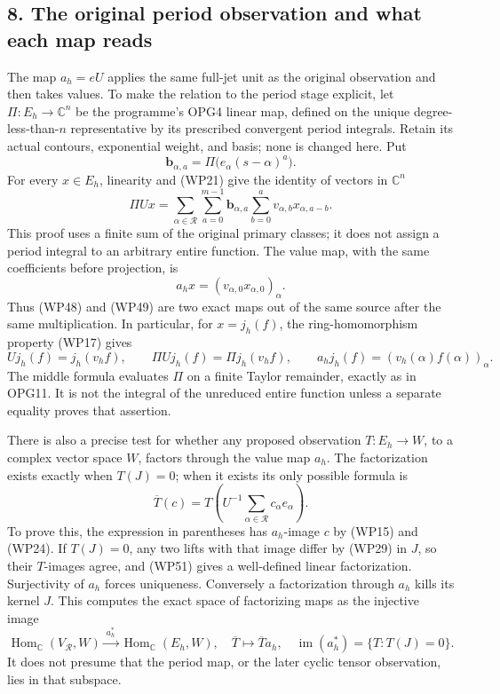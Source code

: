 \documentclass[
  10pt,
  a4paper,
]{article}
\begin{document}
\subsection{8. The original period observation and what each map
reads}\label{the-original-period-observation-and-what-each-map-reads}

The map \(a_h=eU\) applies the same full-jet unit as the original
observation and then takes values. To make the relation to the period
stage explicit, let \(\Pi:E_h\to\mathbb C^n\) be the programme's OPG4
linear map, defined on the unique degree-less-than-\(n\) representative
by its prescribed convergent period integrals. Retain its actual
contours, exponential weight, and basis; none is changed here. Put \[
\mathbf b_{\alpha,a}=\Pi\bigl(e_\alpha(s-\alpha)^a\bigr).
\tag{WP47}
\] For every \(x\in E_h\), linearity and (WP21) give the identity of
vectors in \(\mathbb C^n\) \[
\Pi Ux=
\sum_{\alpha\in\mathcal R}\sum_{a=0}^{m-1}
\mathbf b_{\alpha,a}
\sum_{b=0}^a v_{\alpha,b}x_{\alpha,a-b}.
\tag{WP48}
\] This proof uses a finite sum of the original primary classes; it does
not assign a period integral to an arbitrary entire function. The value
map, with the same coefficients before projection, is \[
a_hx=(v_{\alpha,0}x_{\alpha,0})_\alpha.
\tag{WP49}
\] Thus (WP48) and (WP49) are two exact maps out of the same source
after the same multiplication. In particular, for \(x=j_h(f)\), the
ring-homomorphism property (WP17) gives \[
Uj_h(f)=j_h(v_hf),\qquad
\Pi Uj_h(f)=\Pi j_h(v_hf),\qquad
a_hj_h(f)=(v_h(\alpha)f(\alpha))_\alpha.
\tag{WP50}
\] The middle formula evaluates \(\Pi\) on a finite Taylor remainder,
exactly as in OPG11. It is not the integral of the unreduced entire
function unless a separate equality proves that assertion.

There is also a precise test for whether any proposed observation
\(T:E_h\to W\), to a complex vector space \(W\), factors through the
value map \(a_h\). The factorization exists exactly when \(T(J)=0\);
when it exists its only possible formula is \[
\overline T(c)=T\left(U^{-1}\sum_{\alpha\in\mathcal R}c_\alpha e_\alpha\right).
\tag{WP51}
\] To prove this, the expression in parentheses has \(a_h\)-image \(c\)
by (WP15) and (WP24). If \(T(J)=0\), any two lifts with that image
differ by (WP29) in \(J\), so their \(T\)-images agree, and (WP51) gives
a well-defined linear factorization. Surjectivity of \(a_h\) forces
uniqueness. Conversely a factorization through \(a_h\) kills its kernel
\(J\). This computes the exact space of factorizing maps as the
injective image \[
\operatorname{Hom}_{\mathbb C}(V_{\mathcal R},W)
\xrightarrow{\ a_h^*\ }
\operatorname{Hom}_{\mathbb C}(E_h,W),
\quad \overline T\longmapsto\overline T a_h,
\quad
\operatorname{im}(a_h^*)=\{T:T(J)=0\}.
\tag{WP52}
\] It does not presume that the period map, or the later cyclic tensor
observation, lies in that subspace.
\end{document}
